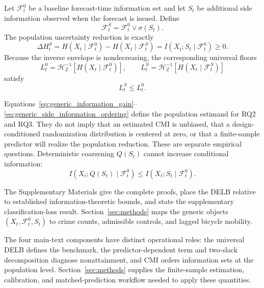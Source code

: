 Let \(\mathcal F_t^0\) be a baseline forecast-time information set and let \(S_t\)
be additional side information observed when the forecast is issued. Define
\begin{equation}
\mathcal F_t^S=\mathcal F_t^0\vee\sigma(S_t).
\label{eq:generic_augmented_information}
\end{equation}
The population uncertainty reduction is exactly
\begin{equation}
\Delta H^S_t
=
H(X_t\mid\mathcal F_t^0)-H(X_t\mid\mathcal F_t^S)
=
I(X_t;S_t\mid\mathcal F_t^0)\geq0.
\label{eq:generic_information_gain}
\end{equation}
Because the inverse envelope is nondecreasing, the corresponding universal floors
\begin{equation}
L_t^0=\mathcal H_{\mathbb Z}^{-1}
\!\left[H(X_t\mid\mathcal F_t^0)\right],
\qquad
L_t^S=\mathcal H_{\mathbb Z}^{-1}
\!\left[H(X_t\mid\mathcal F_t^S)\right]
\label{eq:generic_side_information_bounds}
\end{equation}
satisfy
\begin{equation}
L_t^S\leq L_t^0.
\label{eq:generic_side_information_ordering}
\end{equation}

Equations~\eqref{eq:generic_information_gain}--
\eqref{eq:generic_side_information_ordering} define the population estimand
for RQ2 and RQ3. They do not imply that an estimated CMI is
unbiased, that a design-conditioned randomization distribution is centered
at zero, or that a finite-sample predictor will realize the population
reduction. These are separate empirical questions. Deterministic
coarsening \(Q(S_t)\) cannot increase conditional information:
\begin{equation}
I(X_t;Q(S_t)\mid\mathcal F_t^0)
\leq
I(X_t;S_t\mid\mathcal F_t^0).
\label{eq:generic_data_processing}
\end{equation}

The Supplementary Materials give the complete proofs, place the DELB relative
to established information-theoretic bounds, and state the supplementary
classification-loss result. Section~\ref{sec:methods} maps the generic objects
\((X_t,\mathcal F_t^0,S_t)\) to crime counts, admissible controls, and lagged
bicycle mobility.

The four main-text components have distinct operational roles: the universal
DELB defines the benchmark, the predictor-dependent term and two-slack
decomposition diagnose nonattainment, and CMI orders information sets at the
population level. Section~\ref{sec:methods} supplies the finite-sample
estimation, calibration, and matched-prediction workflow needed to apply
these quantities.
